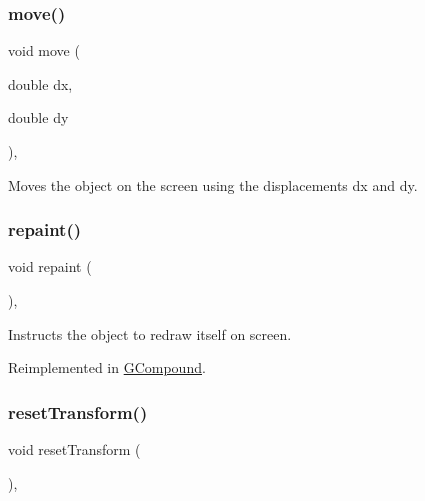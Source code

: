 \subsubsection{\texorpdfstring{move()}{move()}}
{\footnotesize\ttfamily void move (\begin{DoxyParamCaption}\item[{double}]{dx,  }\item[{double}]{dy }\end{DoxyParamCaption})\hspace{0.3cm}{\ttfamily [virtual]}, {\ttfamily [inherited]}}



Moves the object on the screen using the displacements {\ttfamily dx} and {\ttfamily dy}. 

\mbox{\label{classsgl_1_1GObject_ac827b978aa122f136a14c198687ad80f}} 
\subsubsection{\texorpdfstring{repaint()}{repaint()}}
{\footnotesize\ttfamily void repaint (\begin{DoxyParamCaption}{ }\end{DoxyParamCaption})\hspace{0.3cm}{\ttfamily [virtual]}, {\ttfamily [inherited]}}



Instructs the object to redraw itself on screen. 



Reimplemented in \mbox{\hyperlink{classsgl_1_1GCompound_afb8dbc55702230f0030e47d6c009697f}{G\+Compound}}.

\mbox{\label{classsgl_1_1GObject_a6022a1fd1e5dcd2fd5585e5a36aa3f37}} 
\subsubsection{\texorpdfstring{reset\+Transform()}{resetTransform()}}
{\footnotesize\ttfamily void reset\+Transform (\begin{DoxyParamCaption}{ }\end{DoxyParamCaption})\hspace{0.3cm}{\ttfamily [virtual]}, {\ttfamily [inherited]}}



